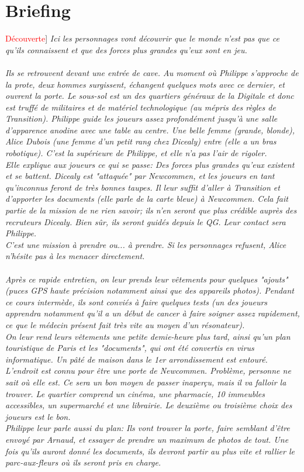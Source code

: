 \documentclass[10pt,a4paper,twocolumn]{article}
\newenvironment{lAbstract}[1]{{[}\textcolor{red}{#1}{]}\itshape}{\\ \\}
\begin{document}
\section{Briefing}
\begin{lAbstract}{Découverte}
Ici les personnages vont découvrir que le monde n'est pas que ce qu'ils connaissent et que des forces plus grandes qu'eux sont en jeu.
\end{lAbstract}
Ils se retrouvent devant une entrée de cave. Au moment où Philippe s'approche de la prote, deux hommes surgissent, échangent quelques mots avec ce dernier, et ouvrent la porte. Le sous-sol est un des quartiers généraux de la Digitale et donc est truffé de militaires et de matériel technologique (au mépris des règles de Transition). Philippe guide les joueurs assez profondément jusqu'à une salle d'apparence anodine avec une table au centre. Une belle femme (grande, blonde), Alice Dubois (une femme d'un petit rang chez Dicealy) entre (elle a un bras robotique). C'est la supérieure de Philippe, et elle n'a pas l'air de rigoler.\\
Elle explique aux joueurs ce qui se passe: Des forces plus grandes qu'eux existent et se battent. Dicealy est "attaquée" par Newcommen, et les joueurs en tant qu'inconnus feront de très bonnes taupes. Il leur suffit d'aller à Transition et d'apporter les documents (elle parle de la carte bleue) à Newcommen. Cela fait partie de la mission de ne rien savoir; ils n'en seront que plus crédible auprès des recruteurs Dicealy. Bien sûr, ils seront guidés depuis le QG. Leur contact sera Philippe.\\
C'est une mission à prendre ou... à prendre. Si les personnages refusent, Alice n'hésite pas à les menacer directement.
\\
\\
Après ce rapide entretien, on leur prends leur vêtements pour quelques "ajouts" (puces GPS haute précision notamment ainsi que des appareils photos). Pendant ce cours intermède, ils sont conviés à faire quelques tests (un des joueurs apprendra notamment qu'il a un début de cancer à faire soigner assez rapidement, ce que le médecin présent fait très vite au moyen d'un résonateur).
\\
On leur rend leurs vêtements une petite demie-heure plus tard, ainsi qu'un plan touristique de Paris et les "documents", qui ont été convertis en virus informatique. Un pâté de maison dans le 1er arrondissement est entouré. L'endroit est connu pour être une porte de Newcommen. Problème, personne ne sait où elle est. Ce sera un bon moyen de passer inaperçu, mais il va falloir la trouver. Le quartier comprend un cinéma, une pharmacie, 10 immeubles accessibles, un supermarché et une librairie. Le deuxième ou troisième choix des joueurs est le bon.\\
Philippe leur parle aussi du plan: Ils vont trouver la porte, faire semblant d'être envoyé par Arnaud, et essayer de \emph{prendre un maximum de photos de tout}. Une fois qu'ils auront donné les documents, ils devront partir au plus vite et rallier le parc-aux-fleurs où ils seront pris en charge. 
\end{document}
